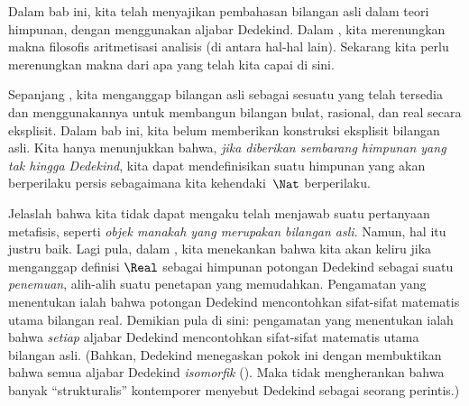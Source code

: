 \documentclass[../../../include/open-logic-section]{subfiles}
\begin{document}


Dalam bab ini, kita telah menyajikan pembahasan bilangan asli dalam teori
himpunan, dengan menggunakan aljabar Dedekind. Dalam
, kita merenungkan makna filosofis aritmetisasi
analisis (di antara hal-hal lain). Sekarang kita perlu merenungkan makna dari
apa yang telah kita capai di sini.

Sepanjang , kita menganggap bilangan asli sebagai
sesuatu yang telah tersedia dan menggunakannya untuk membangun bilangan
bulat, rasional, dan real secara eksplisit. Dalam bab ini, kita belum
memberikan konstruksi eksplisit bilangan asli. Kita hanya menunjukkan bahwa,
\emph{jika diberikan sembarang himpunan yang tak hingga Dedekind}, kita dapat
mendefinisikan suatu himpunan yang akan berperilaku persis sebagaimana kita
kehendaki~$\Nat$ berperilaku.

Jelaslah bahwa kita tidak dapat mengaku telah menjawab suatu pertanyaan
metafisis, seperti \emph{objek manakah yang merupakan bilangan asli}. Namun,
hal itu justru baik. Lagi pula, dalam , kita
menekankan bahwa kita akan keliru jika menganggap definisi $\Real$ sebagai
himpunan potongan Dedekind sebagai suatu \emph{penemuan}, alih-alih suatu
penetapan yang memudahkan. Pengamatan yang menentukan ialah bahwa potongan
Dedekind mencontohkan sifat-sifat matematis utama bilangan real. Demikian
pula di sini: pengamatan yang menentukan ialah bahwa \emph{setiap} aljabar
Dedekind mencontohkan sifat-sifat matematis utama bilangan asli. (Bahkan,
Dedekind menegaskan pokok ini dengan membuktikan bahwa semua aljabar Dedekind
\emph{isomorfik} (\citeyear[Theorems
132--3]{Dedekind1888}). Maka tidak
mengherankan bahwa banyak ``strukturalis'' kontemporer menyebut Dedekind
sebagai seorang perintis.)
\end{document}
